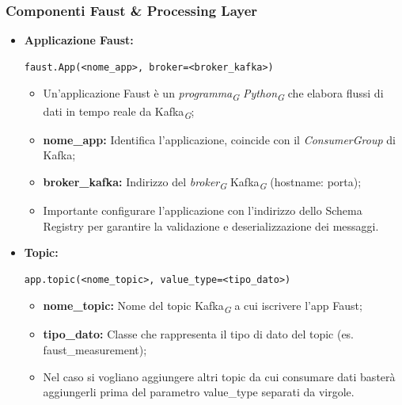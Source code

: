 \subsubsection{Componenti Faust \& Processing Layer}
\begin{itemize}
    \item \textbf{Applicazione Faust:}
    \begin{lstlisting}[style=code]
    faust.App(<nome_app>, broker=<broker_kafka>)
    \end{lstlisting} 
    \begin{itemize}
        \item Un'applicazione Faust è un \textit{programma}\textsubscript{\textit{G}} \textit{Python}\textsubscript{\textit{G}} che elabora flussi di dati in tempo reale da Kafka\textsubscript{\textit{G}};
        \item \textbf{nome\_app:} Identifica l'applicazione, coincide con il \textit{ConsumerGroup} di Kafka;
        \item \textbf{broker\_kafka:} Indirizzo del \textit{broker}\textsubscript{\textit{G}} Kafka\textsubscript{\textit{G}} (hostname: porta);
        \item Importante configurare l'applicazione con l'indirizzo dello Schema Registry per garantire la validazione e deserializzazione dei messaggi.
    \end{itemize}

    \item \textbf{Topic:}
    \begin{lstlisting}[style=code]
    app.topic(<nome_topic>, value_type=<tipo_dato>)
    \end{lstlisting}  
    \begin{itemize}
        \item \textbf{nome\_topic:} Nome del topic Kafka\textsubscript{\textit{G}} a cui iscrivere l'app Faust;
        \item \textbf{tipo\_dato:} Classe che rappresenta il tipo di dato del topic (es. faust\_measurement);
        \item Nel caso si vogliano aggiungere altri topic da cui consumare dati basterà aggiungerli prima del parametro value\_type separati da virgole.
    \end{itemize}


\end{itemize}
